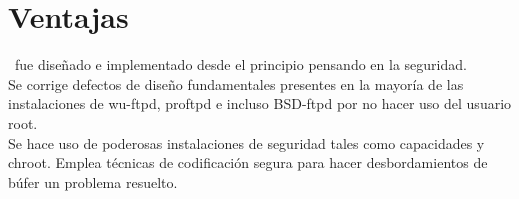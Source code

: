 \section{Ventajas}

  \vsftpd\ fue dise\~nado e implementado desde el principio pensando en la seguridad.\\
  
  Se corrige defectos de dise\~ no fundamentales presentes en la mayor\'ia de las instalaciones de 
  wu-ftpd, proftpd e incluso BSD-ftpd por no hacer uso del usuario root.\\
  
  Se hace uso de poderosas instalaciones de seguridad tales como capacidades y chroot.
  Emplea técnicas de codificación segura para hacer desbordamientos de búfer un problema resuelto.

